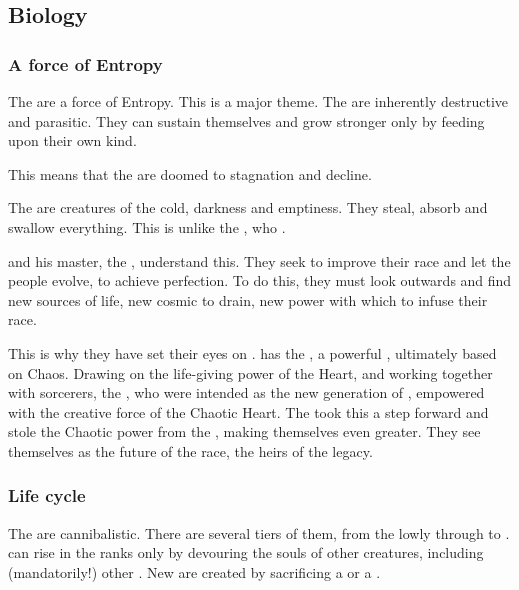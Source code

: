 \subsection{Biology}





\subsubsection{A force of Entropy}
The \banes{} are a force of Entropy. This is a major theme. The \banes{} are inherently destructive and parasitic. They can sustain themselves and grow stronger only by feeding upon their own kind. 

This means that the \banes{} are doomed to stagnation and decline. 

The \banes{} are creatures of the cold, darkness and emptiness. They steal, absorb and swallow everything. This is unlike the \dragons, who . 

 and his master, the , understand this. They seek to improve their race and let the \bane{} people evolve, to achieve perfection. To do this, they must look outwards and find new sources of life, new cosmic \dweomers{} to drain, new power with which to infuse their race. 

This is why they have set their eyes on \Miith{}. 
\Miith{} has the , a powerful \dweomer{}, ultimately based on Chaos. 
Drawing on the life-giving power of the Heart, and working together with  sorcerers,  the , who were intended as the new generation of \banes, empowered with the creative force of the Chaotic Heart. 
The  took this a step forward and stole the Chaotic \xzaishannic{} power from the \dragons, making themselves even greater. They see themselves as the future of the \bane{} race, the heirs of the \bane{} legacy.





\subsubsection{Life cycle}
The \banes are cannibalistic. 
There are several tiers of them, from the lowly \banespawn{} through \lesserbanes{} to \banelords. 
\Banes{} can rise in the ranks only by devouring the souls of other creatures, including (mandatorily!) other \banes. 
New \banespawn{} are created by sacrificing a \lesserbane{} or a \banelord. 







